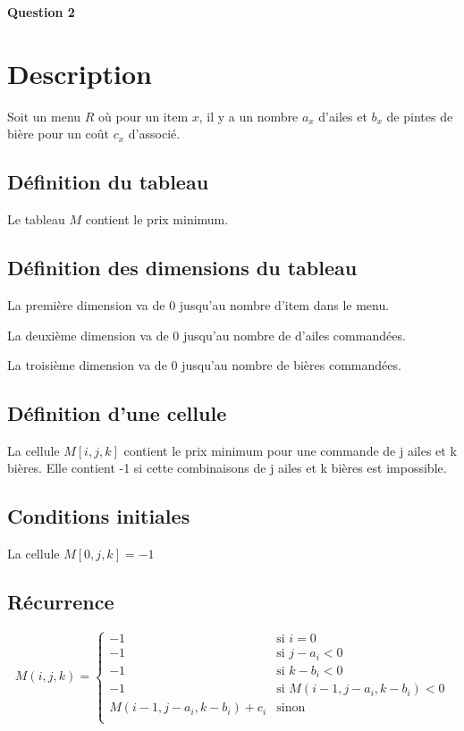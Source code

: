 \documentclass[class=article]{standalone}
\begin{document}
\centerline{\Huge \bf Question 2}
\bigskip

\section*{Description}

Soit un menu $R$ où pour un item $x$, il y a un nombre $a_x$ d'ailes 
et $b_x$ de pintes de bière pour un coût $c_x$ d'associé.

\subsection*{Définition du tableau}

Le tableau $M$ contient le prix minimum.

\subsection*{Définition des dimensions du tableau}

La première dimension va de 0 jusqu'au nombre d'item dans le menu.

La deuxième dimension va de 0 jusqu'au nombre de d'ailes commandées.

La troisième dimension va de 0 jusqu'au nombre de bières commandées.

\subsection*{Définition d'une cellule}

La cellule $M[i,j,k]$ contient le prix minimum pour une commande de j ailes et k bières.
Elle contient -1 si cette combinaisons de j ailes et k bières est impossible.


\subsection*{Conditions initiales}

La cellule $M[0, j, k] = -1$

\subsection*{Récurrence}

\[
    M(i, j, k) =
    \begin{cases}
        -1 & \text{si } i = 0 \\
        -1 & \text{si } j-a_i < 0 \\
        -1 & \text{si } k-b_i < 0 \\
        -1 & \text{si } M(i-1, j-a_i, k-b_i) < 0 \\
        M(i-1, j-a_i, k-b_i) + c_i  & \text{sinon } \\
    \end{cases}
\]
\end{document}
